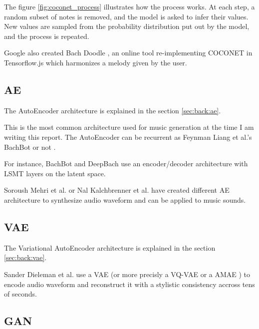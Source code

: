 \documentclass[12pt]{report}
\begin{document}
The figure \ref{fig:coconet_process} illustrates how the process works.
At each step, a random subset of notes is removed, and the model is asked to infer their values.
New values are sampled from the probability distribution put out by the model, and the process is repeated.

Google also created Bach Doodle \cite{huang_bach_2019}, an online tool re-implementing COCONET in Tensorflow.js \cite{noauthor_tensorflowjs_nodate} which harmonizes a melody given by the user.


\subsection{AE}

The AutoEncoder architecture is explained in the section \ref{sec:back:ae}.

This is the most common architecture used for music generation at the time I am writing this report.
The AutoEncoder can be recurrent  \cite{liang_automatic_2017, chuan_modeling_nodate, hadjeres_deepbach:_2016, kalchbrenner_efficient_2018, mehri_samplernn_2017} as Feynman Liang et al.'s BachBot \cite{liang_automatic_2017} or not \cite{dieleman_challenge_2018}.

For instance, BachBot \cite{liang_automatic_2017} and DeepBach \cite{hadjeres_deepbach:_2016} use an encoder/decoder architecture with LSMT layers on the latent space. \cite{chuan_modeling_nodate}

Soroush Mehri et al. \cite{mehri_samplernn_2017} or Nal Kalchbrenner et al. \cite{kalchbrenner_efficient_2018} have created different AE architecture to synthesize audio waveform and can be applied to music sounds.

\subsection{VAE}

The Variational AutoEncoder architecture is explained in the section \ref{sec:back:vae}. 

Sander Dieleman et al. \cite{dieleman_challenge_2018} use a VAE (or more precisly a VQ-VAE \cite{van_den_oord_neural_2017}  or a AMAE \cite{dieleman_challenge_2018}) to encode audio waveform and reconstruct it with a stylistic consistency accross tens of seconds.



\subsection{GAN}
\end{document}
